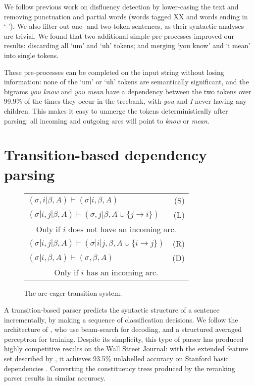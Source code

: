 \documentclass[11pt,letterpaper]{article}
\begin{document}
We follow previous work on disfluency detection by lower-casing the text and
removing punctuation and partial words (words tagged XX and words ending in
`-').  We also filter out one- and two-token sentences, as their syntactic
analyses are trivial.
We found that two additional simple pre-processes improved our results: discarding
all `um' and `uh' tokens; and merging `you know' and `i mean' into single tokens.

These pre-processes can be completed on the input string without losing information:
none of the `um' or `uh' tokens are semantically significant, and
the bigrams \emph{you know} and \emph{you mean} have a dependency between the two
tokens over 99.9\% of the times they occur in the treebank, with \emph{you} and \emph{I}
never having any children. This makes it easy to unmerge the tokens deterministically
after parsing:
all incoming and outgoing arcs will point to \emph{know} or \emph{mean}.


\section{Transition-based dependency parsing}

\begin{figure}
    \centering
    \begin{tabular}{lr}
        $(\sigma,i | \beta, A) \vdash (\sigma | i, \beta, A) $ \hfill & \hfill (S) \\
        $(\sigma | i,j | \beta, A) \vdash ( \sigma, j | \beta, A \cup \{ j \rightarrow i \} ) $ \hfill & \hfill (L) \\
        \multicolumn{2}{c}{Only if $i$ does not have an incoming arc.}\\
        $(\sigma | i,j | \beta, A) \vdash ( \sigma | i | j, \beta, A \cup \{ i \rightarrow j \} ) $ \hfill & \hfill (R) \\
        $(\sigma | i, \beta, A) \vdash ( \sigma, \beta, A )$ \hfill & \hfill  (D) \\
        \multicolumn{2}{c}{Only if $i$ has an incoming arc.}\\


    \end{tabular}
    \caption{\small The arc-eager transition system.\label{fig:ae_notation}}
\end{figure}


A transition-based parser predicts the syntactic structure of a sentence incrementally,
by making a sequence of classification decisions.  We follow the architecture of
\citet{zhang:cl11}, who use beam-search for decoding, and a structured averaged
perceptron for training.  Despite its simplicity, this type of parser
has produced highly competitive results on the Wall Street Journal: with the
extended feature set described by \citet{zhang:11}, it achieves 93.5\%
unlabelled accuracy on Stanford basic dependencies \citep{stanford_deps}.  Converting
the constituency trees produced by the \citet{Charniak05a} reranking parser
results in similar accuracy.
\end{document}
